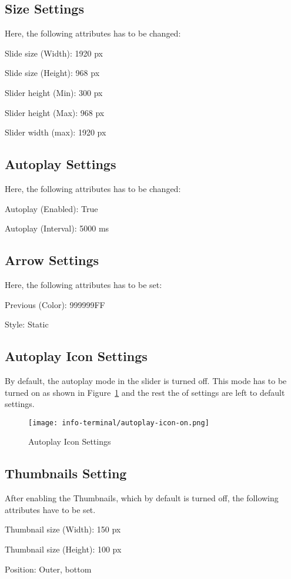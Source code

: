 \subsection*{Size Settings}
Here, the following attributes has to be changed:
\begin{itemize*}
\item Slide size (Width): 1920 px
\item Slide size (Height): 968 px
\item Slider height (Min): 300 px
\item Slider height (Max): 968 px
\item Slider width (max): 1920 px
\end{itemize*}

\subsection*{Autoplay Settings}
Here, the following attributes has to be changed:
\begin{itemize*}
\item Autoplay (Enabled): True
\item Autoplay (Interval): 5000 ms
\end{itemize*}

\subsection*{Arrow Settings}
Here, the following attributes has to be set:
\begin{itemize*}
\item Previous (Color): 999999FF
\item Style: Static
\end{itemize*}

\subsection*{Autoplay Icon Settings}
By default, the autoplay mode in the slider is turned off. This mode has to be turned on as shown in Figure~\ref{autoplay-icon-on} and the rest the of settings are left to default settings.
\begin{figure}[ht]
\caption{Autoplay Icon Settings}
\label{autoplay-icon-on}
\centering
\texttt{[image: info-terminal/autoplay-icon-on.png]}
\end{figure}

\subsection*{Thumbnails Setting}
After enabling the Thumbnails, which by default is turned off, the following attributes have to be set.
\begin{itemize*}
\item Thumbnail size (Width): 150 px
\item Thumbnail size (Height): 100 px
\item Position: Outer, bottom
\end{itemize*}

